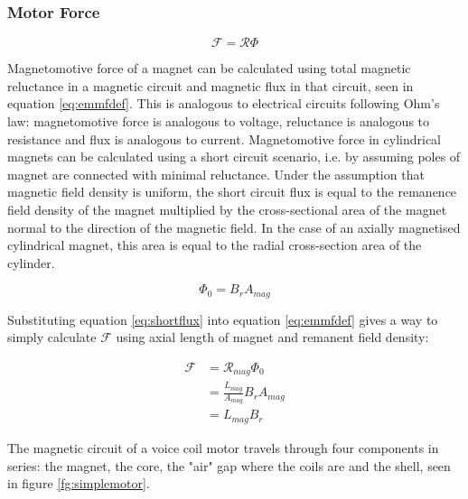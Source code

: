 \documentclass[a4paper,12pt]{article}
\begin{document}
\subsubsection{Motor Force}
\begin{equation} \label{eq:emmfdef}
    \mathcal{F}=\mathcal{R} \Phi
\end{equation}

Magnetomotive force of a magnet can be calculated using total magnetic reluctance in a magnetic circuit and magnetic flux in that circuit, seen in equation \ref{eq:emmfdef}. This is analogous to electrical circuits following Ohm's law: magnetomotive force is analogous to voltage, reluctance is analogous to resistance and flux is analogous to current. Magnetomotive force in cylindrical magnets can be calculated using a short circuit scenario, i.e. by assuming poles of magnet are connected with minimal reluctance. Under the assumption that magnetic field density is uniform, the short circuit flux is equal to the remanence field density of the magnet multiplied by the cross-sectional area of the magnet normal to the direction of the magnetic field. In the case of an axially magnetised cylindrical magnet, this area is equal to the radial cross-section area of the cylinder.

\begin{equation} \label{eq:shortflux}
    \Phi_0 = B_rA_{mag}
\end{equation}

Substituting equation \ref{eq:shortflux} into equation \ref{eq:emmfdef} gives a way to simply calculate $\mathcal{F}$ using axial length of magnet and remanent field density:

\begin{equation} \label{eq:emmf1}
    \begin{split}
        \mathcal{F} & = \mathcal{R}_{mag} \Phi_0\\
        & = \frac{L_{mag}}{A_{mag}}B_r A_{mag}\\
        & = L_{mag} B_r
    \end{split}
\end{equation}

The magnetic circuit of a voice coil motor travels through four components in series: the magnet, the core, the "air" gap where the coils are and the shell, seen in figure \ref{fg:simplemotor}.
\end{document}
